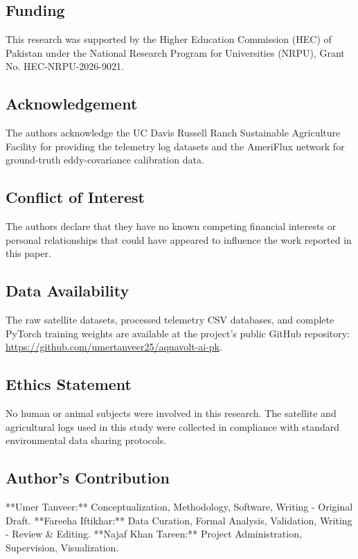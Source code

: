 \documentclass[final,3p,times,twocolumn]{elsarticle}
\begin{document}
\subsection*{Funding}
This research was supported by the Higher Education Commission (HEC) of Pakistan under the National Research Program for Universities (NRPU), Grant No. HEC-NRPU-2026-9021.

\subsection*{Acknowledgement}
The authors acknowledge the UC Davis Russell Ranch Sustainable Agriculture Facility for providing the telemetry log datasets and the AmeriFlux network for ground-truth eddy-covariance calibration data.

\subsection*{Conflict of Interest}
The authors declare that they have no known competing financial interests or personal relationships that could have appeared to influence the work reported in this paper.

\subsection*{Data Availability}
The raw satellite datasets, processed telemetry CSV databases, and complete PyTorch training weights are available at the project's public GitHub repository: \url{https://github.com/umertanveer25/aquavolt-ai-pk}.

\subsection*{Ethics Statement}
No human or animal subjects were involved in this research. The satellite and agricultural logs used in this study were collected in compliance with standard environmental data sharing protocols.

\subsection*{Author's Contribution}
**Umer Tanveer:** Conceptualization, Methodology, Software, Writing - Original Draft. **Fareeha Iftikhar:** Data Curation, Formal Analysis, Validation, Writing - Review \& Editing. **Najaf Khan Tareen:** Project Administration, Supervision, Visualization.
\end{document}
